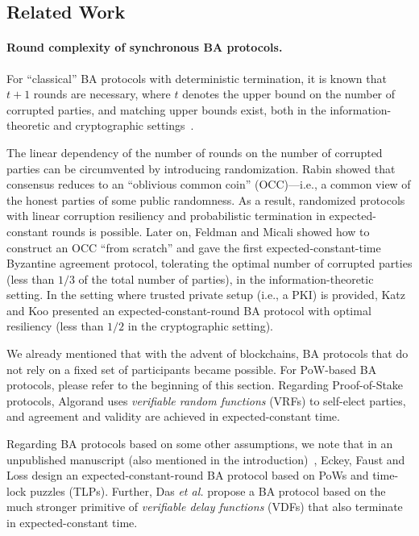 \subsection{Related Work}
\label{subsec:related-work}

\paragraph{Round complexity of synchronous BA protocols.}
%
For ``classical'' BA protocols with deterministic termination, it is known that $t + 1$ rounds \cite{InfProcessLett:FisLyn82} are necessary, where $t$ denotes the upper bound on the number of corrupted parties, and matching upper bounds exist, both in the information-theoretic and cryptographic settings~\cite{TOPLAS:LamShoPea82,SICOMP:DolStr83,STOC:GarMos93}.

The linear dependency of the number of rounds on the number of corrupted parties can be circumvented by introducing randomization.
%
Rabin \cite{FOCS:Rabin83} showed that consensus reduces to an ``oblivious common coin'' (OCC)---i.e., a common view of the honest parties of some public randomness.
%
As a result, randomized protocols with linear corruption resiliency and probabilistic termination in expected-constant rounds is possible.
%
Later on, Feldman and Micali \cite{STOC:FelMic88} showed how to construct an OCC ``from scratch'' and gave the first expected-constant-time Byzantine agreement protocol, tolerating the optimal number of corrupted parties (less than $1/3$ of the total number of parties), in the information-theoretic setting.
%
In the setting where trusted private setup (i.e., a PKI) is provided, Katz and Koo \cite{C:KatKoo06}  presented an expected-constant-round BA protocol with optimal resiliency (less than $1/2$ in the cryptographic setting).

We already mentioned that with the advent of blockchains, BA protocols that do not rely on a fixed set of participants became possible.
%
For PoW-based BA protocols, please refer to the beginning of this section.
%
Regarding Proof-of-Stake protocols, Algorand \cite{TCS:CheMic19} uses \emph{verifiable random functions} (VRFs) to self-elect parties, and agreement and validity are achieved in expected-constant time.

Regarding BA protocols based on some other assumptions, we note that in an unpublished manuscript (also mentioned in the introduction)~\cite{EPRINT:EckFauLos17}, Eckey, Faust and Loss design an expected-constant-round BA protocol based on PoWs and time-lock puzzles (TLPs).
%
Further, Das \textit{et al.} \cite{EPRINT:DEFLM22} propose a BA protocol based on the much stronger primitive of \emph{verifiable delay functions} (VDFs) that also terminate in expected-constant time.

